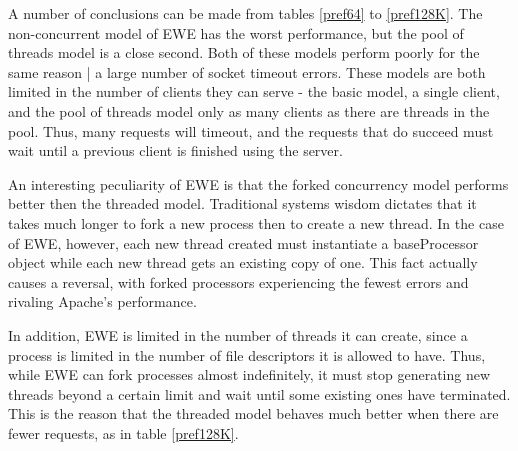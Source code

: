 \documentclass{article}
\begin{document}
A number of conclusions can be made from tables \ref{pref64} to \ref{pref128K}.
The non-concurrent model of EWE has the worst performance, but the pool of threads model is a close second.
Both of these models perform poorly for the same reason | a large number of socket timeout errors.
These models are both limited in the number of clients they can serve - the basic model, a single client, and the pool of threads model only as many clients as there are threads in the pool.
Thus, many requests will timeout, and the requests that do succeed must wait until a previous client is finished using the server.

An interesting peculiarity of EWE is that the forked concurrency model performs better then the threaded model.
Traditional systems wisdom dictates that it takes much longer to fork a new process then to create a new thread.
In the case of EWE, however, each new thread created must instantiate a baseProcessor object while each new thread gets an existing copy of one.
This fact actually causes a reversal, with forked processors experiencing the fewest errors and rivaling Apache's performance.

In addition, EWE is limited in the number of threads it can create, since a process is limited in the number of file descriptors it is allowed to have.
Thus, while EWE can fork processes almost indefinitely, it must stop generating new threads beyond a certain limit and wait until some existing ones have terminated.
This is the reason that the threaded model behaves much better when there are fewer requests, as in table \ref{pref128K}.
\end{document}
